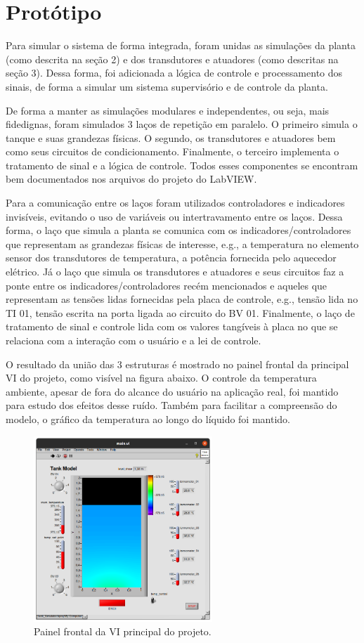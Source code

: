 \section{Protótipo}

Para simular o sistema de forma integrada, foram unidas as simulações da planta (como descrita na seção 2) e dos transdutores e atuadores (como descritas na seção 3). Dessa forma, foi adicionada a lógica de controle e processamento dos sinais, de forma a simular um sistema supervisório e de controle da planta.

De forma a manter as simulações modulares e independentes, ou seja, mais fidedignas, foram simulados 3 laços de repetição em paralelo. O primeiro simula o tanque e suas grandezas físicas. O segundo, os transdutores e atuadores bem como seus circuitos de condicionamento. Finalmente, o terceiro implementa o tratamento de sinal e a lógica de controle. Todos esses componentes se encontram bem documentados nos arquivos do projeto do LabVIEW.

Para a comunicação entre os laços foram utilizados controladores e indicadores invisíveis, evitando o uso de variáveis ou intertravamento entre os laços. Dessa forma, o laço que simula a planta se comunica com os indicadores/controladores que representam as grandezas físicas de interesse, e.g., a temperatura no elemento sensor dos transdutores de temperatura, a potência fornecida pelo aquecedor elétrico. Já o laço que simula os transdutores e atuadores e seus circuitos faz a ponte entre os indicadores/controladores recém mencionados e aqueles que representam as tensões lidas fornecidas pela placa de controle, e.g., tensão lida no TI 01, tensão escrita na porta ligada ao circuito do BV 01. Finalmente, o laço de tratamento de sinal e controle lida com os valores tangíveis à placa no que se relaciona com a interação com o usuário e a lei de controle.

O resultado da união das 3 estruturas é mostrado no painel frontal da principal VI do projeto, como visível na figura abaixo. O controle da temperatura ambiente, apesar de fora do alcance do usuário na aplicação real, foi mantido para estudo dos efeitos desse ruído. Também para facilitar a compreensão do modelo, o gráfico da temperatura ao longo do líquido foi mantido.

\begin{figure}[H]
    \centering
    \includegraphics[width=0.6\textwidth]{imagens/main_frontpanel.png}
    \caption{Painel frontal da VI principal do projeto.}
    \label{fig:imagens-main_frontpanel-png}
\end{figure}

